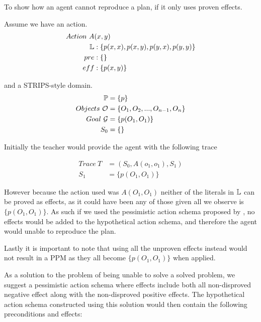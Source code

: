 \documentclass[\master/Master.tex]{subfiles}
\begin{document}
	\begin{example}
		To show how an agent cannot reproduce a plan, if it only uses proven effects.
		
		Assume we have an action.
		\begin{equation*}
			\begin{split}
				Action ~ A &(x, y) \\
					\mathbb{L}&: \{ p(x,x), p(x,y), p(y,x), p(y,y) \} \\
					pre&: \{\} \\
					eff&: \{p(x,y)\}			
			\end{split}
		\end{equation*}
		
		and a STRIPS-style domain.
		\begin{equation*}
			\begin{split}
				\mathbb{P} &= \{p\}		\\
				Objects~\mathcal{O} &= \{O_1,O_2,...,O_{n-1},O_n\} \\
				Goal~\mathcal{G} &= \{p(O_1,O_1)\} \\
				S_0 &=\{\}
			\end{split}
		\end{equation*}
		
		Initially the teacher would provide the agent with the following trace
		
		\begin{equation*}
			\begin{split}				
				Trace~T &= (S_0,A(o_1,o_1),S_1) \\
				S_1 &= \{p(O_1,O_1)\}				
			\end{split}
		\end{equation*}
		
		However because the action used was $A(O_1,O_1)$ neither of the literals in $\mathbb{L}$ can be proved as effects, as it could have been any of those given all we observe is $\{p(O_1,O_1)\}$. 
		As such if we used the pessimistic action schema proposed by \cite{Walsh2008}, no effects would be added to the hypothetical action schema, and therefore the agent would unable to reproduce the plan. 
		
		Lastly it is important to note that using all the unproven effects instead would not result in a PPM as they all become $\{p(O_1,O_1)\}$ when applied.
		
	\end{example}
	
As a solution to the problem of being unable to solve a solved problem, we suggest a pessimistic action schema where effects include both all non-disproved negative effect along with the non-disproved positive effects.
The hypothetical action schema constructed using this solution would then contain the following preconditions and effects:
\end{document}
